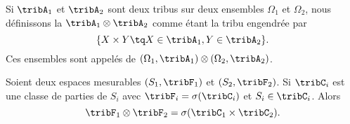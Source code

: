 \begin{definition}      \label{DefTribProfGfYTuR}
    Si \( \tribA_1\) et \( \tribA_2\) sont deux tribus sur deux ensembles \( \Omega_1\) et \( \Omega_2\), nous définissons la  \( \tribA_1\otimes\tribA_2\) comme étant la tribu engendrée par
    \begin{equation}
        \{ X\times Y\tq X\in\tribA_1,Y\in\tribA_2 \}.
    \end{equation}
    Ces ensembles sont appelés  de \( (\Omega_1,\tribA_1)\otimes (\Omega_2,\tribA_2)\).
\end{definition}

\begin{proposition}        \label{PropLJJWooKqWlTr}
    Soient deux espaces mesurables \( (S_1,\tribF_1)\) et \( (S_2,\tribF_2)\). Si \( \tribC_i\) est une classe de parties de \( S_i\) avec \( \tribF_i=\sigma(\tribC_i)\) et \( S_i\in\tribC_i\). Alors
    \begin{equation}
        \tribF_1\otimes \tribF_2=\sigma(\tribC_1\times \tribC_2).
    \end{equation}
\end{proposition}

